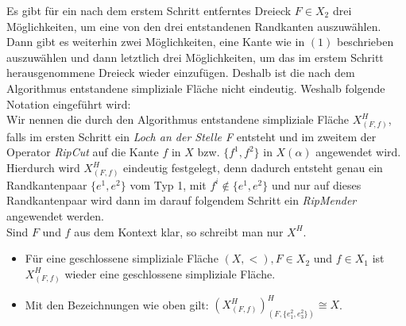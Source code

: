 \documentclass[12pt,titlepage]{article}
\begin{document}

\begin{bemerkung}
Es gibt für ein nach dem erstem Schritt entferntes Dreieck $F \in X_{2}$ drei Möglichkeiten, um eine von den drei entstandenen Randkanten auszuwählen. Dann gibt es weiterhin zwei Möglichkeiten, eine Kante wie in $(1)$ beschrieben auszuwählen und dann letztlich drei Möglichkeiten, um das im erstem Schritt herausgenommene Dreieck wieder einzufügen. Deshalb ist die nach dem Algorithmus entstandene simpliziale Fläche nicht eindeutig. Weshalb folgende Notation eingeführt wird: \\
Wir nennen die durch den Algorithmus entstandene simpliziale Fläche $X^{H}_{(F,f)}$, falls im ersten Schritt ein \emph{Loch an der Stelle F} entsteht und im zweitem der Operator \emph{RipCut} auf die Kante $f$ in $X$ bzw. $\{f^1,f^2\}$ in $X(\alpha)$ angewendet wird. Hierdurch wird $X^{H}_{(F,f)}$ eindeutig festgelegt, denn dadurch entsteht genau ein Randkantenpaar $\{e^1,e^2\}$ vom Typ 1, mit $f^i \notin \{e^1,e^2\}$ und nur auf dieses Randkantenpaar wird dann im darauf folgendem Schritt ein \emph{RipMender} angewendet werden.\\ Sind $F$ und $f$ aus dem Kontext klar, so schreibt man nur $X^H$.
\end{bemerkung}
\begin{bemerkung}
\begin{itemize}
\item Für eine geschlossene simpliziale Fläche $(X,<),F \in X_2$ und $f \in X_1$ ist $X^H_{(F,f)}$ wieder eine geschlossene simpliziale Fläche.
\item Mit den Bezeichnungen wie oben gilt: $(X^H_{(F,f)})^H_{(F,\{e_1^2,e_3^2\})}\cong X$.
\end{itemize}
\end{bemerkung}
\end{document}
